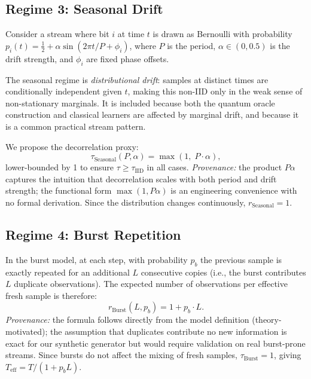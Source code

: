 \documentclass[sensors,article,submit,pdftex,moreauthors]{Definitions/mdpi}
\newcommand{\Teff}{T_{\mathrm{eff}}}
\begin{document}
\subsection{Regime 3: Seasonal Drift}

Consider a stream where bit $i$ at time $t$ is drawn as Bernoulli with probability $p_i(t) = \tfrac{1}{2} + \alpha \sin(2\pi t/P + \phi_i)$, where $P$ is the period, $\alpha \in (0, 0.5)$ is the drift strength, and $\phi_i$ are fixed phase offsets.

The seasonal regime is \emph{distributional drift}: samples at distinct times are conditionally independent given $t$, making this non\nobreakdash-IID only in the weak sense of non-stationary marginals. It is included because both the quantum oracle construction and classical learners are affected by marginal drift, and because it is a common practical stream pattern.

We propose the decorrelation proxy:
\begin{equation}
    \tau_{\text{Seasonal}}(P, \alpha) = \max(1,\; P \cdot \alpha),
    \label{eq:tau_seasonal}
\end{equation}
lower-bounded by 1 to ensure $\tau \geq \tau_{\text{IID}}$ in all cases. \emph{Provenance:} the product $P\alpha$ captures the intuition that decorrelation scales with both period and drift strength; the functional form $\max(1, P\alpha)$ is an engineering convenience with no formal derivation. Since the distribution changes continuously, $r_{\text{Seasonal}} = 1$.

\subsection{Regime 4: Burst Repetition}

In the burst model, at each step, with probability $p_b$ the previous sample is exactly repeated for an additional $L$ consecutive copies (i.e., the burst contributes $L$ duplicate observations). The expected number of observations per effective fresh sample is therefore:
\begin{equation}
    r_{\text{Burst}}(L, p_b) = 1 + p_b \cdot L.
    \label{eq:r_burst}
\end{equation}
\emph{Provenance:} the formula follows directly from the model definition (theory\nobreakdash-motivated); the assumption that duplicates contribute no new information is exact for our synthetic generator but would require validation on real burst-prone streams. Since bursts do not affect the mixing of fresh samples, $\tau_{\text{Burst}} = 1$, giving $\Teff = T/(1 + p_b L)$.
\end{document}
